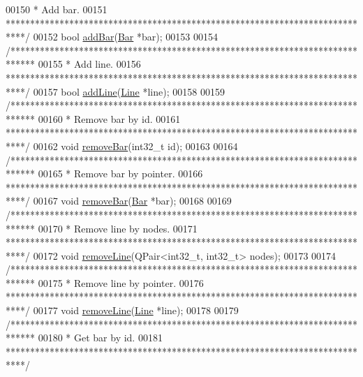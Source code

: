 \begin{DoxyCode}
00150 \textcolor{comment}{   * Add bar.}
00151 \textcolor{comment}{   ****************************************************************************/}
00152   \textcolor{keywordtype}{bool} \hyperlink{group___graphics_ga8c5dfef0216731246f7411e1a5fbee01}{addBar}(\hyperlink{class_bar}{Bar} *bar);
00153 
00154   \textcolor{comment}{/*****************************************************************************}
00155 \textcolor{comment}{   * Add line.}
00156 \textcolor{comment}{   ****************************************************************************/}
00157   \textcolor{keywordtype}{bool} \hyperlink{group___graphics_gae02945131494987b3ff9b59b627719b4}{addLine}(\hyperlink{class_line}{Line} *line);
00158 
00159   \textcolor{comment}{/*****************************************************************************}
00160 \textcolor{comment}{   * Remove bar by id.}
00161 \textcolor{comment}{   ****************************************************************************/}
00162   \textcolor{keywordtype}{void} \hyperlink{group___graphics_ga997ce4f03d316b9f138f2e64e6ca400c}{removeBar}(int32\_t \textcolor{keywordtype}{id});
00163 
00164   \textcolor{comment}{/*****************************************************************************}
00165 \textcolor{comment}{   * Remove bar by pointer.}
00166 \textcolor{comment}{   ****************************************************************************/}
00167   \textcolor{keywordtype}{void} \hyperlink{group___graphics_ga997ce4f03d316b9f138f2e64e6ca400c}{removeBar}(\hyperlink{class_bar}{Bar} *bar);
00168 
00169   \textcolor{comment}{/*****************************************************************************}
00170 \textcolor{comment}{   * Remove line by nodes.}
00171 \textcolor{comment}{   ****************************************************************************/}
00172   \textcolor{keywordtype}{void} \hyperlink{group___graphics_ga1eef3317224a7a06348fce07e581a9ad}{removeLine}(QPair<int32\_t, int32\_t> nodes);
00173 
00174   \textcolor{comment}{/*****************************************************************************}
00175 \textcolor{comment}{   * Remove line by pointer.}
00176 \textcolor{comment}{   ****************************************************************************/}
00177   \textcolor{keywordtype}{void} \hyperlink{group___graphics_ga1eef3317224a7a06348fce07e581a9ad}{removeLine}(\hyperlink{class_line}{Line} *line);
00178 
00179   \textcolor{comment}{/*****************************************************************************}
00180 \textcolor{comment}{   * Get bar by id.}
00181 \textcolor{comment}{   ****************************************************************************/}

\end{DoxyCode}
